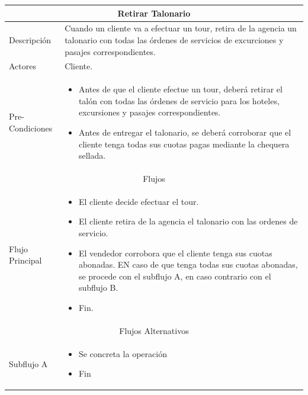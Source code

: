 \documentclass[12pt,a4paper]{article}
\begin{document}
		\begin{center}
			\begin{tabular}{|l|p{10cm}|}
				\hline
				\multicolumn{2}{|c|}{Retirar Talonario}\\ \hline
				Descripción & Cuando un cliente va a efectuar un tour, retira de la agencia un talonario con todas las órdenes de servicios de excurciones y pasajes correspondientes. \\ \hline

				Actores & Cliente. \\ \hline

				Pre-Condiciones & 
					\begin{itemize}[leftmargin=*,noitemsep,topsep=0pt]
						\item Antes de que el cliente efectue un tour, deberá retirar el talón con todas las órdenes de servicio para los hoteles, excursiones y pasajes correspondientes.
						\item Antes de entregar el talonario, se deberá corroborar que el cliente tenga todas sus cuotas pagas mediante la chequera sellada.
					\end{itemize}
					\\ \hline

				\multicolumn{2}{|c|}{Flujos} \\ \hline

				Flujo Principal & 
					\begin{itemize}[leftmargin=*,noitemsep,topsep=0pt]
						\item El cliente decide efectuar el tour.
						\item El cliente retira de la agencia el talonario con las ordenes de servicio.
						\item El vendedor corrobora que el cliente tenga sus cuotas abonadas. EN caso de que tenga todas sus cuotas abonadas, se procede con el subflujo A, en caso contrario con el subflujo B.
						\item Fin.
					\end{itemize}\\ \hline

				\multicolumn{2}{|c|}{Flujos Alternativos} \\ \hline

				Subflujo A & 
					\begin{itemize}[leftmargin=*,noitemsep,topsep=0pt]
						\item Se concreta la operación
						\item Fin
					\end{itemize} \\ \hline


\end{tabular}
\end{center}
\end{document}
